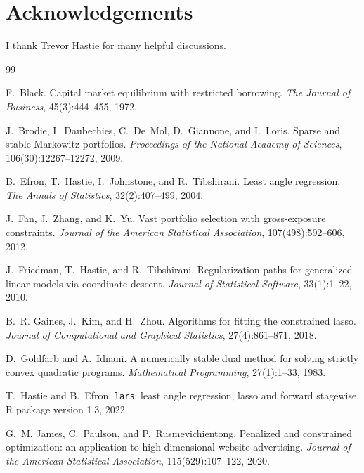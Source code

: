 \documentclass[11pt]{article}
\begin{document}
\section*{Acknowledgements}

I thank Trevor Hastie for many helpful discussions.

\begin{thebibliography}{99}\setlength{\itemsep}{0pt}

F.~Black.
\newblock Capital market equilibrium with restricted borrowing.
\newblock \emph{The Journal of Business}, 45(3):444--455, 1972.

J.~Brodie, I.~Daubechies, C.~De~Mol, D.~Giannone, and I.~Loris.
\newblock Sparse and stable {M}arkowitz portfolios.
\newblock \emph{Proceedings of the National Academy of Sciences}, 106(30):12267--12272,
2009.

B.~Efron, T.~Hastie, I.~Johnstone, and R.~Tibshirani.
\newblock Least angle regression.
\newblock \emph{The Annals of Statistics}, 32(2):407--499, 2004.

J.~Fan, J.~Zhang, and K.~Yu.
\newblock Vast portfolio selection with gross-exposure constraints.
\newblock \emph{Journal of the American Statistical Association}, 107(498):592--606,
2012.

J.~Friedman, T.~Hastie, and R.~Tibshirani.
\newblock Regularization paths for generalized linear models via coordinate descent.
\newblock \emph{Journal of Statistical Software}, 33(1):1--22, 2010.

B.~R. Gaines, J.~Kim, and H.~Zhou.
\newblock Algorithms for fitting the constrained lasso.
\newblock \emph{Journal of Computational and Graphical Statistics}, 27(4):861--871, 2018.

D.~Goldfarb and A.~Idnani.
\newblock A numerically stable dual method for solving strictly convex quadratic
programs.
\newblock \emph{Mathematical Programming}, 27(1):1--33, 1983.

T.~Hastie and B.~Efron.
\newblock \texttt{lars}: least angle regression, lasso and forward stagewise.
\newblock R package version 1.3, 2022.

G.~M. James, C.~Paulson, and P.~Rusmevichientong.
\newblock Penalized and constrained optimization: an application to high-dimensional
website advertising.
\newblock \emph{Journal of the American Statistical Association}, 115(529):107--122,
2020.


\end{thebibliography}
\end{document}
